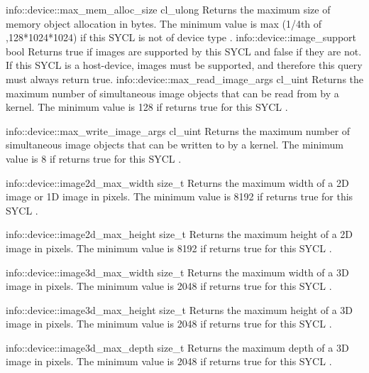     \addInfoRow
     {info::device::max_mem_alloc_size}
     {cl_ulong}
     {
      Returns the maximum size of memory object allocation in  bytes. The minimum value is max (1/4th of ,128*1024*1024) if this SYCL  is not of device type .
     }
   \addInfoRow
     {info::device::image_support}
     {bool}
     {
       Returns true if images are supported by this SYCL  and
       false if they are not. If this SYCL  is a
       \gls{host-device}, images must be supported, and therefore this query
       must always return true.
     }
   \addInfoRow
     {info::device::max_read_image_args}
     {cl_uint}
     {
      Returns the maximum number of simultaneous image objects that can be read from by a kernel. The minimum value is 128 if  returns true for this SYCL .
        }

   \addInfoRow
     {info::device::max_write_image_args}
     {cl_uint}
     {
    Returns the maximum number of simultaneous image objects that can be written to by a kernel. The minimum value is 8 if  returns true for this SYCL .
     }

   \addInfoRow
     {info::device::image2d_max_width}
     {size_t}
     {
    Returns the maximum width of a 2D image or 1D image in pixels. The minimum value is 8192 if  returns true for this SYCL .
     }

   \addInfoRow
     {info::device::image2d_max_height}
     {size_t}
     {
    Returns the maximum height of a 2D image in pixels. The minimum value is 8192 if  returns true for this SYCL .
     }

   \addInfoRow
     {info::device::image3d_max_width}
     {size_t}
     {
     Returns the maximum width of a 3D image in pixels. The minimum value is 2048 if  returns true for this SYCL .
     }

   \addInfoRow
     {info::device::image3d_max_height}
     {size_t}
     {
     Returns the maximum height of a 3D image in pixels. The minimum value is 2048 if  returns true for this SYCL .
     }

  \addInfoRow
  {info::device::image3d_max_depth}
  {size_t}
  {
    Returns the maximum depth of a 3D image in pixels. The minimum value is 2048 if  returns true for this SYCL .
  }
  
